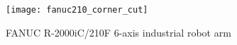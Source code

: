 \begin{figure}[H]
	\centering
	\texttt{[image: fanuc210\_corner\_cut]}
	\caption{FANUC R-2000iC/210F 6-axis industrial robot arm}
	\label{fig:fanuc210}
\end{figure}
\pagestyle{empty}

	\cleardoublepage